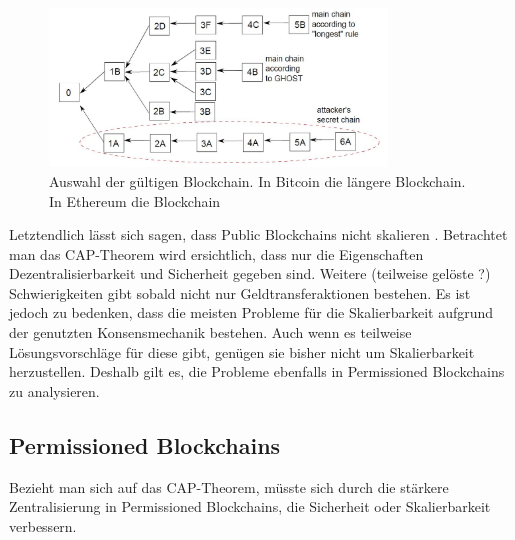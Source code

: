 \begin{figure}[htb]
  \centering
    \includegraphics[width=0.8\textwidth,angle=0]{images/forking-risks}
     \caption{Auswahl der gültigen Blockchain. In Bitcoin die längere Blockchain. In Ethereum die Blockchain }
    \label{fig:forking-risks}
\end{figure} 

Letztendlich lässt sich sagen, dass Public Blockchains nicht skalieren \cite{SchererPerformanceScalabilityBlockchain2017}. Betrachtet man das CAP-Theorem wird ersichtlich, dass nur die Eigenschaften Dezentralisierbarkeit und Sicherheit gegeben sind. Weitere (teilweise gelöste ?) Schwierigkeiten gibt sobald nicht nur Geldtransferaktionen bestehen. Es ist jedoch zu bedenken, dass die meisten Probleme für die Skalierbarkeit aufgrund der genutzten Konsensmechanik bestehen. Auch wenn es teilweise Lösungsvorschläge für diese gibt, genügen sie bisher nicht um Skalierbarkeit herzustellen. Deshalb gilt es, die Probleme ebenfalls in Permissioned Blockchains zu analysieren. 



\subsection{Permissioned Blockchains}
Bezieht man sich auf das CAP-Theorem, müsste sich durch die stärkere Zentralisierung in Permissioned Blockchains, die Sicherheit oder Skalierbarkeit verbessern. 

